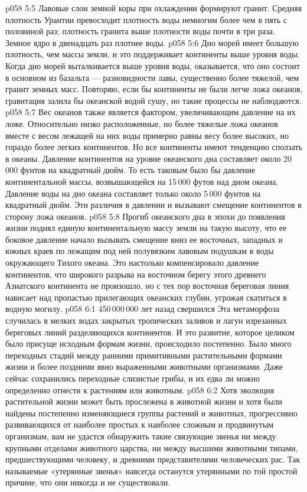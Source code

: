 \vs p058 5:5 \pc Лавовые слои земной коры при охлаждении формируют гранит. Средняя плотность Урантии превосходит плотность воды немногим более чем в пять с половиной раз; плотность гранита выше плотности воды почти в три раза. Земное ядро в двенадцать раз плотнее воды.
\vs p058 5:6 Дно морей имеет большую плотность, чем массы земли, и это поддерживает континенты выше уровня воды. Когда дно морей выталкивается выше уровня воды, оказывается, что оно состоит в основном из базальта --- разновидности лавы, существенно более тяжелой, чем гранит земных масс. Повторяю, если бы континенты не были легче ложа океанов, гравитация залила бы океанской водой сушу, но такие процессы не наблюдаются.
\vs p058 5:7 Вес океанов также является фактором, увеличивающим давление на их ложе. Относительно низко расположенные, но более тяжелые ложа океанов вместе с весом лежащей на них воды примерно равны весу более высоких, но гораздо более легких континентов. Но все континенты имеют тенденцию сползать в океаны. Давление континентов на уровне океанского дна составляет около 20\,000 фунтов на квадратный дюйм. То есть таковым было бы давление континентальной массы, возвышающейся на 15\,000 футов над дном океана. Давление воды на дно океана составляет только около 5\,000 фунтов на квадратный дюйм. Эти различия в давлении и вызывают смещение континентов в сторону ложа океанов.
\vs p058 5:8 Прогиб океанского дна в эпохи до появления жизни поднял единую континентальную массу земли на такую высоту, что ее боковое давление начало вызывать смещение вниз ее восточных, западных и южных краев по лежащим под ней полувязким лавовым подушкам в воды окружающего Тихого океана. Это настолько компенсировало давление континентов, что широкого разрыва на восточном берегу этого древнего Азиатского континента не произошло, но с тех пор восточная береговая линия нависает над пропастью прилегающих океанских глубин, угрожая скатиться в водную могилу.
\vs p058 6:1 450\,000\,000 лет назад свершился  Эта метаморфоза случилась в мелких водах закрытых тропических заливов и лагун изрезанных береговых линий разделяющихся континентов. И это развитие, которое целиком было присуще исходным формам жизни, происходило постепенно. Было много переходных стадий между ранними примитивными растительными формами жизни и более поздними явно выраженными животными организмами. Даже сейчас сохранились переходные слизистые грибы, и их едва ли можно определенно отнести к растениям или животным.
\vs p058 6:2 \pc Хотя эволюция растительной жизни может быть прослежена в животной жизни и хотя были найдены постепенно изменяющиеся группы растений и животных, прогрессивно развивающихся от наиболее простых к наиболее сложным и продвинутым организмам, вам не удастся обнаружить такие связующие звенья ни между крупными отделами животного царства, ни между высшими животными типами, предшествующими человеку, и древними представителями человеческих рас. Так называемые «утерянные звенья» навсегда останутся утерянными по той простой причине, что они никогда и не существовали.
